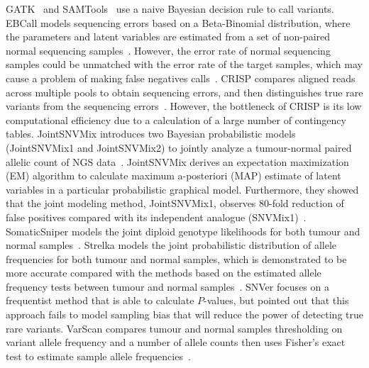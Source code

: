 \documentclass{bmcart}
\begin{document}
GATK~\cite{mckenna2010genome} and SAMTools~\cite{li2009sequence} use a naive Bayesian decision rule to call variants.
EBCall models sequencing errors based on a Beta-Binomial distribution, where the parameters and latent variables are estimated from a set of non-paired normal sequencing samples~\cite{shiraishi2013empirical}.
However, the error rate of normal sequencing samples could be unmatched with the error rate of the target samples, which may cause a problem of making false negatives calls~\cite{wang2013detecting}.
CRISP compares aligned reads across multiple pools to obtain sequencing errors, and then distinguishes true rare variants from the sequencing errors~\cite{bansal2010statistical}.
However, the bottleneck of CRISP is its low computational efficiency due to a calculation of a large number of contingency tables.
%
JointSNVMix introduces two Bayesian probabilistic models (JointSNVMix1 and JointSNVMix2) to jointly analyze a tumour-normal paired allelic count of NGS data~\cite{roth2012jointsnvmix}.
JointSNVMix derives an expectation maximization (EM) algorithm to calculate maximum a-posteriori (MAP) estimate of latent variables in a particular probabilistic graphical model.
Furthermore, they showed that the joint modeling method, JointSNVMix1, observes 80-fold reduction of false positives compared with its independent analogue (SNVMix1)~\cite{roth2012jointsnvmix}.
SomaticSniper models the joint diploid genotype likelihoods for both tumour and normal samples~\cite{larson2012somaticsniper}.
Strelka models the joint probabilistic distribution of allele frequencies for both tumour and normal samples, which is demonstrated to be more accurate compared with the methods based on the estimated allele frequency tests between tumour and normal samples~\cite{saunders2012strelka}.
SNVer focuses on a frequentist method that is able to calculate $P$-values, but \cite{wei2011snver} pointed out that this approach fails to model sampling bias that will reduce the power of detecting true rare variants.
VarScan compares tumour and normal samples thresholding on variant allele frequency and a number of allele counts then uses Fisher's exact test to estimate sample allele frequencies~\cite{koboldt2012varscan}.
\end{document}
